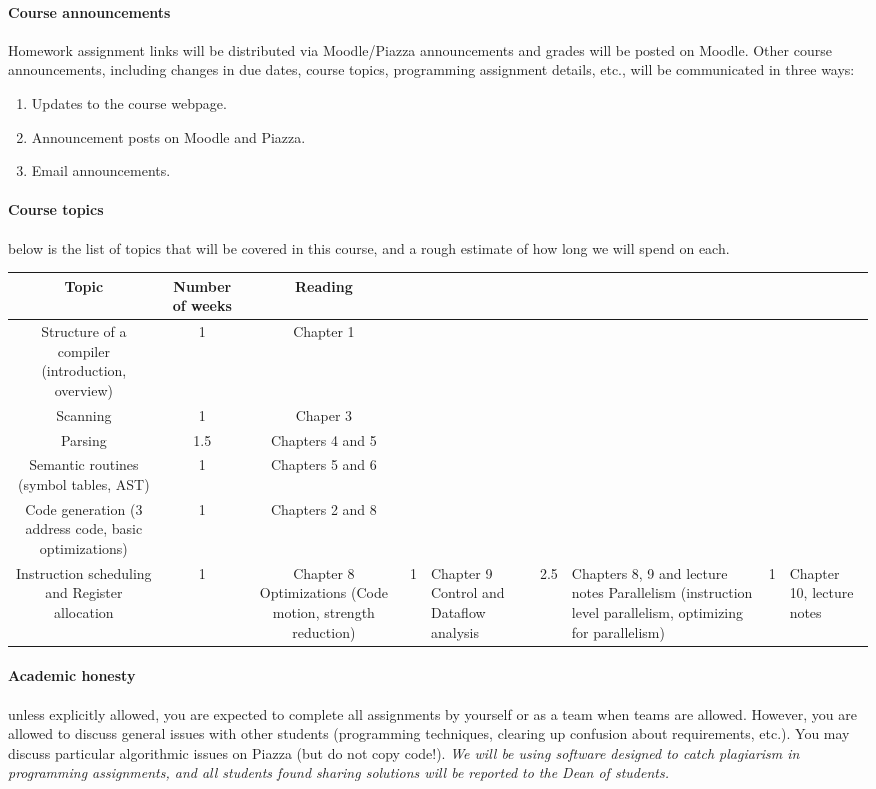 \documentclass{article}
\begin{document}
\paragraph{Course announcements} Homework assignment links will be distributed via Moodle/Piazza announcements and grades will be posted on Moodle. Other course announcements, including changes in due dates, course topics, programming assignment details, etc., will be communicated in three ways:
\begin{enumerate}
\item Updates to the course webpage.
\item Announcement posts on Moodle and Piazza.
\item Email announcements.
\end{enumerate}

\paragraph{Course topics} below is the list of topics that will be covered in this course, and a rough estimate of how long we will spend on each. 
\begin{table}[H]
\centering
	\begin{tabulary}{\linewidth}{|c|c|c|} \hline
		Topic & Number of weeks & Reading \\ \hline
		Structure of a compiler (introduction, overview) & 1 & Chapter 1\\ \hline
		Scanning & 1 & Chaper 3 \\ \hline
		Parsing & 1.5 & Chapters 4 and 5 \\ \hline
		Semantic routines (symbol tables, AST)  & 1 & Chapters 5 and 6\\ \hline
		Code generation (3 address code, basic optimizations) & 1 & Chapters 2 and 8 \\
		Instruction scheduling and Register allocation & 1 & Chapter 8
		Optimizations (Code motion, strength reduction) & 1 & Chapter 9 
		Control and Dataflow analysis & 2.5 & Chapters 8, 9 and lecture notes
		Parallelism (instruction level parallelism, optimizing for parallelism) & 1 & Chapter 10, lecture notes  
\hline
\end{tabulary}
\end{table}


\paragraph{Academic honesty} unless explicitly allowed, you are expected to complete all
assignments by yourself or as a team when teams are allowed. 
However, you are allowed to discuss general issues with other
students (programming techniques, clearing up confusion about requirements, etc.).
You may discuss particular algorithmic issues on Piazza (but do not copy code!). {\em We will
be using software designed to catch plagiarism in programming assignments, and all
students found sharing solutions will be reported to the Dean of students.}
\end{document}
